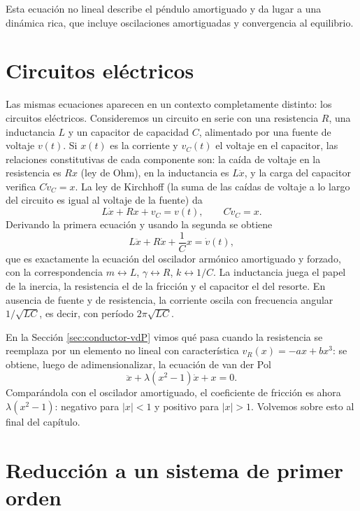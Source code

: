 \documentclass[12pt, a4paper]{amsbook}
\theoremstyle{remark}
\theoremstyle{definition}
\numberwithin{section}{chapter}
\numberwithin{subsection}{section}
\numberwithin{equation}{section}
\numberwithin{figure}{chapter}
\begin{document}
Esta ecuación no lineal describe el péndulo amortiguado y da lugar a una dinámica rica, que incluye oscilaciones amortiguadas y convergencia al equilibrio.

\section{Circuitos eléctricos}\label{sec:circuitos}

Las mismas ecuaciones aparecen en un contexto completamente distinto: los circuitos eléctricos. Consideremos un circuito en serie con una resistencia $R$, una inductancia $L$ y un capacitor de capacidad $C$, alimentado por una fuente de voltaje $v(t)$. Si $x(t)$ es la corriente y $v_C(t)$ el voltaje en el capacitor, las relaciones constitutivas de cada componente son: la caída de voltaje en la resistencia es $Rx$ (ley de Ohm), en la inductancia es $L\dot x$, y la carga del capacitor verifica $C\dot v_C = x$. La ley de Kirchhoff (la suma de las caídas de voltaje a lo largo del circuito es igual al voltaje de la fuente) da
\[
L\dot x + Rx + v_C = v(t),\qquad C\dot v_C = x.
\]
Derivando la primera ecuación y usando la segunda se obtiene
\[
L\ddot x + R\dot x + \frac{1}{C}x = \dot v(t),
\]
que es exactamente la ecuación del oscilador armónico amortiguado y forzado, con la correspondencia $m\leftrightarrow L$, $\gamma\leftrightarrow R$, $k\leftrightarrow 1/C$. La inductancia juega el papel de la inercia, la resistencia el de la fricción y el capacitor el del resorte. En ausencia de fuente y de resistencia, la corriente oscila con frecuencia angular $1/\sqrt{LC}$, es decir, con período $2\pi\sqrt{LC}$.

En la Sección \ref{sec:conductor-vdP} vimos qué pasa cuando la resistencia se reemplaza por un elemento no lineal con característica $v_R(x) = -ax+bx^3$: se obtiene, luego de adimensionalizar, la ecuación de van der Pol
\begin{equation}\label{eq:vdP-cap3}
\ddot x + \lambda(x^2-1)\dot x + x = 0 .
\end{equation}
Comparándola con el oscilador amortiguado, el coeficiente de fricción es ahora $\lambda(x^2-1)$: negativo para $|x|<1$ y positivo para $|x|>1$. Volvemos sobre esto al final del capítulo.

\section{Reducción a un sistema de primer orden}
\end{document}
